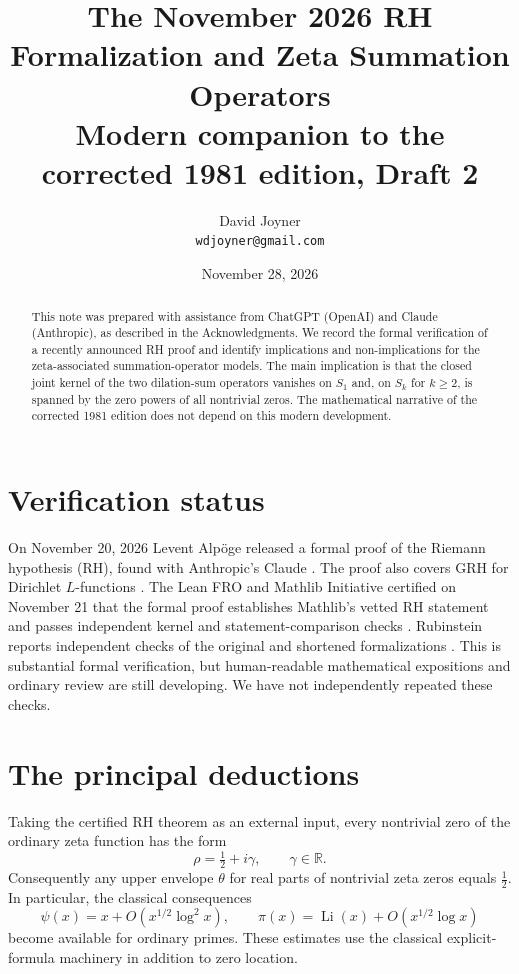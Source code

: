 \documentclass[12pt,letterpaper]{article}
\title{The November 2026 RH Formalization and Zeta Summation Operators\\
\large Modern companion to the corrected 1981 edition, Draft 2}
\author{David Joyner\\\texttt{wdjoyner@gmail.com}}
\date{November 28, 2026}
\numberwithin{equation}{section}
\theoremstyle{definition}
\begin{document}
\maketitle
\begin{abstract}
This note was prepared with assistance from ChatGPT (OpenAI) and Claude
(Anthropic), as described in the Acknowledgments. We record the formal verification of a recently
announced RH proof and identify implications and non-implications for
the zeta-associated summation-operator models. The main implication is that
the closed joint kernel of the two dilation-sum operators vanishes on $S_1$
and, on $S_k$ for $k\ge2$, is spanned by the zero powers of all nontrivial
zeros. The mathematical narrative of the corrected 1981 edition does not
depend on this modern development.
\end{abstract}
\section{Verification status}
On November 20, 2026 Levent Alp\"oge released a formal proof of the
Riemann hypothesis (RH), found with Anthropic's Claude \cite{Ru26}.
The proof also covers GRH for Dirichlet $L$-functions \cite{Ru26}. The Lean FRO and
Mathlib Initiative certified on November 21 that the formal proof
establishes Mathlib's vetted RH statement and passes independent
kernel and statement-comparison checks \cite{LF26}.
Rubinstein reports independent checks of the original and shortened
formalizations \cite{Ru26}. This is substantial formal verification,
but human-readable mathematical expositions and ordinary review are
still developing. We have not independently repeated these checks.

\section{The principal deductions}
Taking the certified RH theorem as an external input, every nontrivial zero of the ordinary zeta function
has the form
\begin{equation}\label{eq:rho}
 \rho=\tfrac12+i\gamma,\qquad\gamma\in\mathbb R.
\end{equation}
Consequently any upper envelope $\theta$ for real parts of nontrivial
zeta zeros equals $\tfrac12$. In particular, the classical consequences
\begin{equation}\label{eq:prime-error}
 \psi(x)=x+O(x^{1/2}\log^2x),\qquad
 \pi(x)=\operatorname{Li}(x)+O(x^{1/2}\log x)
\end{equation}
become available for ordinary primes. These estimates use the
classical explicit-formula machinery in addition to zero location.
\end{document}
